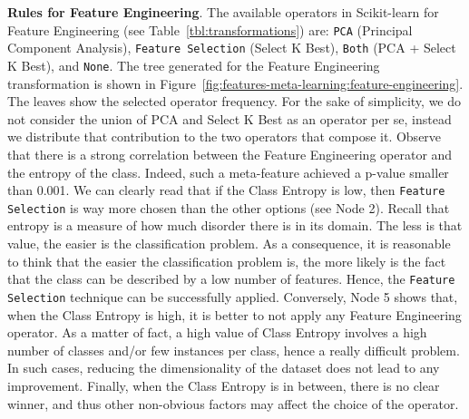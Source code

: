 \begin{example}
\textbf{Rules for Feature Engineering}. The available operators in Scikit-learn for Feature Engineering (see Table~\ref{tbl:transformations}) are: \texttt{PCA} (Principal Component Analysis), \texttt{Feature Selection} (Select K Best), \texttt{Both} (PCA + Select K Best), and \texttt{None}. The tree generated for the Feature Engineering transformation is shown in Figure~\ref{fig:features-meta-learning:feature-engineering}. The leaves show the selected operator frequency. For the sake of simplicity, we do not consider the union of PCA and Select K Best as an operator per se, instead we distribute that contribution to the two operators that compose it.
Observe that there is a strong correlation between the Feature Engineering operator and the entropy of the class.
Indeed, such a meta-feature achieved a p-value smaller than 0.001.
We can clearly read that if the Class Entropy is low, then \texttt{Feature Selection} is way more chosen than the other options (see Node 2).
Recall that entropy is a measure of how much disorder there is in its domain.
The less is that value, the easier is the classification problem.
As a consequence, it is reasonable to think that the easier the classification problem is, the more likely is the fact that the class can be described by a low number of features.
Hence, the \texttt{Feature Selection} technique can be successfully applied.
Conversely, Node 5 shows that, when the Class Entropy is high, it is better to not apply any Feature Engineering operator.
As a matter of fact, a high value of Class Entropy involves a high number of classes and/or few instances per class, hence a really difficult problem.
In such cases, reducing the dimensionality of the dataset does not lead to any improvement.
Finally, when the Class Entropy is in between, there is no clear winner, and thus other non-obvious factors may affect the choice of the operator.


\end{example}
